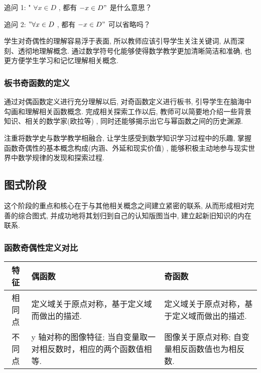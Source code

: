 追问 1: " $\forall x \in D$ , 都有 $-x \in D "$ 是什么意思？

追问 2: $" \forall x \in D$ , 都有 $-x \in D "$ 可以省略吗？

\begin{purpose}
	学生对奇偶性的理解容易浮于表面, 所以教师应该引导学生关注关键词, 从而深刻、透彻地理解概念. 通过数学符号化能够使得数学教学更加清晰简洁和准确, 也更方便学生学习和记忆理解相关概念.
\end{purpose}

\subsubsection{板书奇函数的定义}
通过对偶函数定义进行充分理解以后, 对奇函数定义进行板书, 引导学生在脑海中勾画和理解相关函数概念. 完成相关探索工作以后, 教师可以简要地介绍一些背景知识、相关的数学家(欧拉等) , 同时还能够揭示出它与幂函数之间的历史渊源.

\begin{purpose}
	注重将数学史与数学教学相融合, 让学生感受到数学知识学习过程中的乐趣, 掌握函数奇偶性的基本概念构成(内涵、外延和现实价值) , 能够积极主动地参与现实世界中数学规律的发现和探索过程.
\end{purpose}

\subsection{图式阶段}
这个阶段的重点和核心在于与其他相关概念之间建立紧密的联系, 从而形成相对完善的综合图式, 并成功地将其划归到自己的认知版图当中, 建立起新旧知识的内在联系.
\subsubsection{函数奇偶性定义对比}
\begin{center}
	\begin{tabularx}{\textwidth}{|c|X|X|}
		\hline
		特征  & 偶函数                                 & 奇函数                      \\
		\hline
		相同点 & 定义域关于原点对称，基于定义域而做出的描述.               & 定义域关于原点对称，基于定义域而做出的描述.    \\
		\hline
		不同点 & y 轴对称的图像特征; 当自变量取一对相反数时，相应的两个函数值相等.  & 图像关于原点对称; 自变量相反函数值也为相反数.  \\
		\hline
	\end{tabularx}
\end{center}

